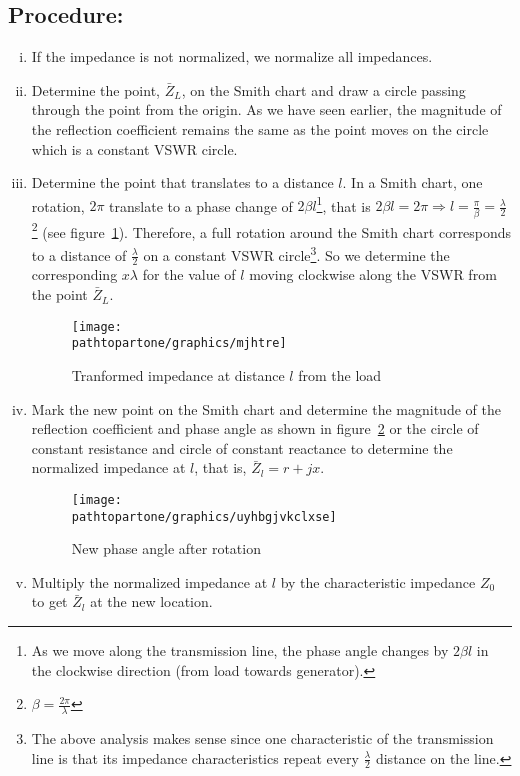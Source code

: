 \subsection*{Procedure:}
\begin{enumerate}[(i)]
\item If the impedance is not normalized, we normalize all impedances.
\item Determine the point, $\bar{Z}_L$, on the Smith chart and draw a circle passing through the point from the origin. As we have seen earlier, the magnitude of the reflection coefficient remains the same as the point moves on the circle which is a constant VSWR circle.
\item Determine the point that translates to a distance $l$. In a Smith chart, one rotation, $2\pi$ translate to a phase change of $2\beta{l}$\footnote{
As we move along the transmission line, the phase angle changes by $2\beta{l}$ in the clockwise direction (from load towards generator).
}, that is $2\beta{l} = 2\pi\Longrightarrow l = \frac{\pi}{\beta} = \frac{\lambda}{2}$\footnote{
$\beta = \frac{2\pi}{\lambda}$
} (see figure~\ref{fig:mjhtre}). Therefore, a full rotation around the Smith chart corresponds to a distance of $\frac{\lambda}{2}$ on a constant VSWR circle\footnote{
The above analysis makes sense since one characteristic of the transmission line is that its impedance characteristics repeat every $\frac{\lambda}{2}$ distance on the line.
}. So we determine the corresponding $x\lambda$ for the value of $l$ moving clockwise along the VSWR from the point $\bar{Z}_L$.
\begin{figure}[h]
\centering
\texttt{[image: \\pathtopartone/graphics/mjhtre]}
\caption{Tranformed impedance at distance $l$ from the load}
\label{fig:mjhtre}
\end{figure}

\item Mark the new point on the Smith chart and determine the magnitude of the reflection coefficient and phase angle as shown in figure~\ref{fig:uyhbgjvkclxse} or the circle of constant resistance and circle of constant reactance to determine the normalized impedance at $l$, that is, $\bar{Z}_{l} = r + jx$.
\begin{figure}[h]
\centering
\texttt{[image: \\pathtopartone/graphics/uyhbgjvkclxse]}
\caption{New phase angle after rotation}
\label{fig:uyhbgjvkclxse}
\end{figure}

\item Multiply the normalized impedance at $l$ by the characteristic impedance $Z_0$ to get $\bar{Z}_{l}$ at the new location.
\end{enumerate}

